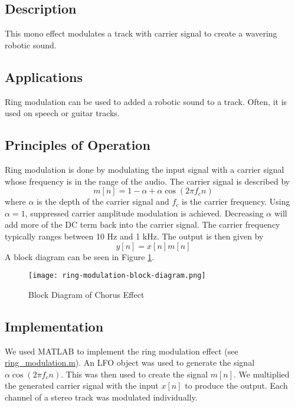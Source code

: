 \subsection{Description}
This mono effect modulates a track with carrier signal to create a wavering robotic sound.

\subsection{Applications}
Ring modulation can be used to added a robotic sound to a track. Often, it is used on speech or guitar tracks.

\subsection{Principles of Operation}
Ring modulation is done by modulating the input signal with a carrier signal whose frequency is in the range of the audio. The carrier signal is described by $$m[n] = 1 - \alpha + \alpha \cos(2 \pi f_c n)$$ where $\alpha$ is the depth of the carrier signal and $f_c$ is the carrier frequency. Using $\alpha = 1$, suppressed carrier amplitude modulation is achieved. Decreasing $\alpha$ will add more of the DC term back into the carrier signal. The carrier frequency typically ranges between 10 Hz and 1 kHz. The output is then given by $$y[n] = x[n] m[n]$$ A block diagram can be seen in Figure \ref{fig:ring-modulation-block-diagram}.
\begin{figure}[ht]
    \centering
    \texttt{[image: ring-modulation-block-diagram.png]}
    \caption{Block Diagram of Chorus Effect}
    \label{fig:ring-modulation-block-diagram}
\end{figure}

\subsection{Implementation}
We used MATLAB to implement the ring modulation effect (see \href{run:../ring_modulation.m}{ring\_modulation.m}). An LFO object was used to generate the signal $\alpha \cos(2 \pi f_c n)$. This was then used to create the signal $m[n]$. We multiplied the generated carrier signal with the input $x[n]$ to produce the output. Each channel of a stereo track was modulated individually.

